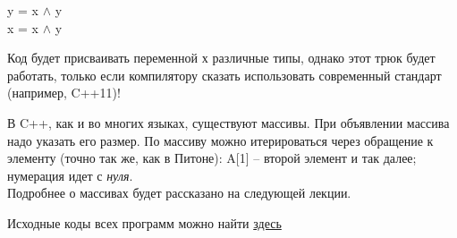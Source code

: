 \begin{lecture}[\lectureSubject]
\begin{lecSection}
\begin{enumerate}
			y = x $\wedge$ y \\
			x = x $\wedge$ y \\
		\end{enumerate}
	\end{lecSection}
	\begin{lecSection}
		Код будет присваивать переменной х различные типы, однако этот трюк будет работать, только если компилятору сказать использовать современный стандарт (например, C++11)!
	\end{lecSection}
	
	\begin{lecSection}
		В C++, как и во многих языках, существуют массивы.
		При объявлении массива надо указать его размер. По массиву можно итерироваться через обращение к элементу (точно так же, как в Питоне): A[1] -- второй элемент и так далее; нумерация идет с \textit{нуля}.\\
		 Подробнее о массивах будет рассказано на следующей лекции.
	\end{lecSection}
	
			\begin{center}
				{Исходные коды всех программ можно найти \href{https://github.com/alekseik1/cpp\_lections\_2017/tree/master/lection\%202}{здесь}}
			\end{center}
\end{lecture}

\renewcommand{\mainFolder}{/home/aleksei/github_projects/latex_works/informatics}
\renewcommand{\myFolder}{\mainFolder/lecture_\arabic{lectureNo}/}

\renewcommand{\lectureSubject}{Адреса и указатели}
%


